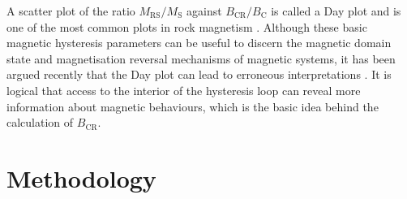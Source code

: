 A scatter plot of the ratio $M_{\text{RS}}/M_{\text{S}}$ against $B_{\text{CR}}/B_{\text{C}}$ is called a Day plot \citep{Day1977} and is one of the most common plots in rock magnetism \citep{Dunlop}. Although these basic magnetic hysteresis parameters can be useful to discern the magnetic domain state and magnetisation reversal mechanisms of magnetic systems, it has been argued recently that the Day plot can lead to erroneous interpretations \citep{Egli2014,Roberts2017}. It is logical that access to the interior of the hysteresis loop can reveal more information about magnetic behaviours, which is the basic idea behind the calculation of $B_{\text{CR}}$.\par

\section{Methodology}
